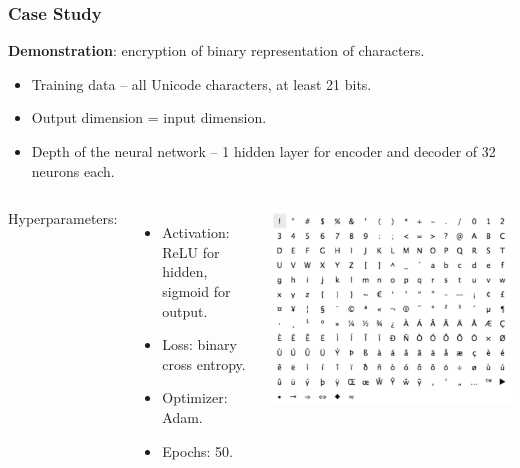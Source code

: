 \documentclass{beamer}
\begin{document}
\begin{frame}
    \frametitle{Case Study}
    \textbf{Demonstration}: encryption of binary representation of characters.
    \begin{itemize}
        \item Training data -- all Unicode characters, at least 21 bits.
        \item Output dimension = input dimension.
        \item Depth of the neural network -- 1 hidden layer for encoder and decoder \cite{autoencoder2} of 32 neurons each.
    \end{itemize}
    \begin{columns}
        Hyperparameters:
        \begin{itemize}
            \item Activation: ReLU for hidden, sigmoid for output.
            \item Loss: binary cross entropy.
            \item Optimizer: Adam.
            \item Epochs: 50.
        \end{itemize}
        \centering
        \includegraphics[width=\textwidth]{img/unicode_chars.png}
    \end{columns}
\end{frame}
\end{document}
